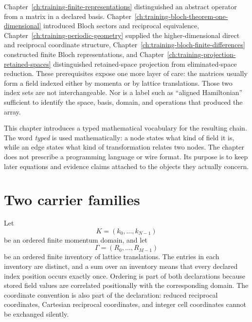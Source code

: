 Chapter~\ref{ch:training-finite-representations} distinguished an abstract
operator from a matrix in a declared basis.
Chapter~\ref{ch:training-bloch-theorem-one-dimensional} introduced Bloch
sectors and reciprocal equivalence, Chapter~\ref{ch:training-periodic-geometry}
supplied the higher-dimensional direct and reciprocal coordinate structure,
Chapter~\ref{ch:training-bloch-finite-differences} constructed finite Bloch
representations, and Chapter~\ref{ch:training-projection-retained-spaces}
distinguished retained-space projection from eliminated-space reduction.
These prerequisites expose one more layer of care: the matrices usually form a
field indexed either by momenta or by lattice translations. Those two index
sets are not interchangeable. Nor is a label such as ``aligned Hamiltonian''
sufficient to identify the space, basis, domain, and operations that produced
the array.

This chapter introduces a typed mathematical vocabulary for the resulting
chain. The word \emph{typed} is used mathematically: a node states what kind of
field it is, while an edge states what kind of transformation relates two
nodes. The chapter does not prescribe a programming language or wire format.
Its purpose is to keep later equations and evidence claims attached to the
objects they actually concern.

\section{Two carrier families}

Let
\begin{equation}
  K=(k_0,\ldots,k_{N-1})
  \label{eq:representation-carrier-momentum-domain}
\end{equation}
be an ordered finite momentum domain, and let
\begin{equation}
  \Gamma=(R_0,\ldots,R_{M-1})
  \label{eq:representation-carrier-translation-domain}
\end{equation}
be an ordered finite inventory of lattice translations. The entries in each
inventory are distinct, and a sum over an inventory means that every declared
index position occurs exactly once. Ordering is part of both declarations
because stored field values are correlated positionally with the corresponding
domain. The coordinate convention is also part of the declaration: reduced
reciprocal coordinates, Cartesian reciprocal coordinates, and integer cell
coordinates cannot be exchanged silently.

